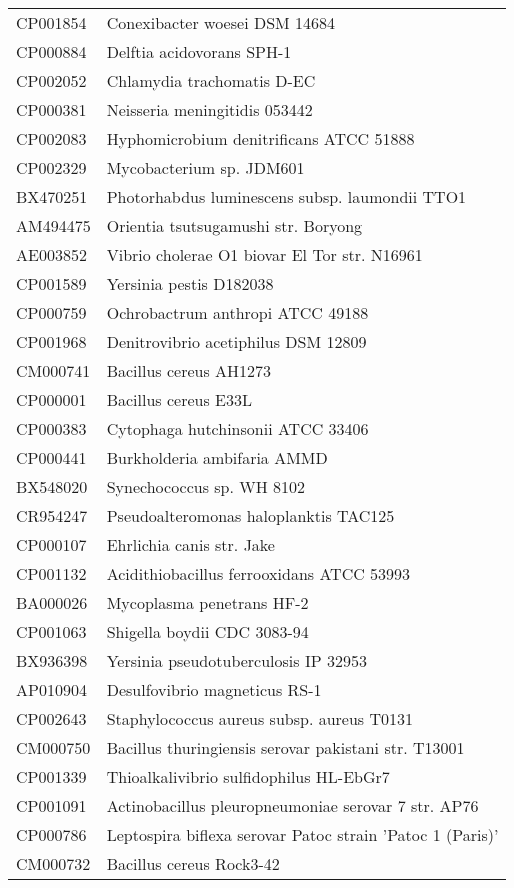 \begin{longtable}{ll}
CP001854 & Conexibacter woesei DSM 14684\\
CP000884 & Delftia acidovorans SPH-1\\
CP002052 & Chlamydia trachomatis D-EC\\
CP000381 & Neisseria meningitidis 053442\\
CP002083 & Hyphomicrobium denitrificans ATCC 51888\\
CP002329 & Mycobacterium sp. JDM601\\
BX470251 & Photorhabdus luminescens subsp. laumondii TTO1\\
AM494475 & Orientia tsutsugamushi str. Boryong\\
AE003852 & Vibrio cholerae O1 biovar El Tor str. N16961\\
CP001589 & Yersinia pestis D182038\\
CP000759 & Ochrobactrum anthropi ATCC 49188\\
CP001968 & Denitrovibrio acetiphilus DSM 12809\\
CM000741 & Bacillus cereus AH1273\\
CP000001 & Bacillus cereus E33L\\
CP000383 & Cytophaga hutchinsonii ATCC 33406\\
CP000441 & Burkholderia ambifaria AMMD\\
BX548020 & Synechococcus sp. WH 8102\\
CR954247 & Pseudoalteromonas haloplanktis TAC125\\
CP000107 & Ehrlichia canis str. Jake\\
CP001132 & Acidithiobacillus ferrooxidans ATCC 53993\\
BA000026 & Mycoplasma penetrans HF-2\\
CP001063 & Shigella boydii CDC 3083-94\\
BX936398 & Yersinia pseudotuberculosis IP 32953\\
AP010904 & Desulfovibrio magneticus RS-1\\
CP002643 & Staphylococcus aureus subsp. aureus T0131\\
CM000750 & Bacillus thuringiensis serovar pakistani str. T13001\\
CP001339 & Thioalkalivibrio sulfidophilus HL-EbGr7\\
CP001091 & Actinobacillus pleuropneumoniae serovar 7 str. AP76\\
CP000786 & Leptospira biflexa serovar Patoc strain 'Patoc 1 (Paris)'\\
CM000732 & Bacillus cereus Rock3-42\\

\end{longtable}
